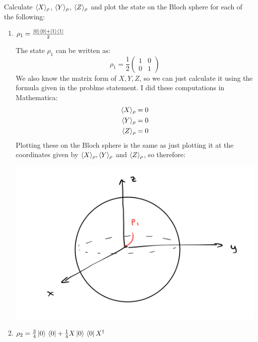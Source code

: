 \documentclass[10pt]{article}
\begin{document}
	 Calculate \( \langle X \rangle_{\rho} \), \( \langle Y \rangle_{\rho} \), \( \langle Z \rangle_{\rho} \) and plot 
	 the state on the Bloch sphere 
	 for each of the following:
	 \begin{enumerate}[label=\alph*)]
	 	\item \( \rho_1 = \frac{\ket*{0}\bra*{0} + \ket*{1}\bra*{1}}{2} \)

			\begin{solution}
				The state \( \rho_1 \) can be written as:
				\[
					\rho_1 = \frac{1}{2}\begin{pmatrix} 1 & 0\\0& 1 \end{pmatrix} 
				\] 
				We also know the matrix form of \( X, Y, Z \), so we can just calculate it using the formula given 
				in the problme statement. I did these computations
				in Mathematica: 
				\begin{align*}
					\langle X \rangle_\rho &= 0\\
					\langle Y \rangle_\rho &= 0 \\
					\langle Z \rangle_{\rho} &=  0 
				\end{align*}
				Plotting these on the Bloch sphere is the same as just plotting it at the coordinates
				given by \( \langle X \rangle_{\rho}, \langle Y \rangle_{\rho}  \) and \( \langle Z \rangle_{\rho} \), so therefore:
				\begin{center}
					\includegraphics[scale=0.2]{q3a.jpeg}
				\end{center}
			\end{solution}
		\item \( \rho_2 = \frac{3}{4}\ket*{0} \bra*{0} + \frac{1}{4}X\ket*{0} \bra*{0} X^{\dagger}\) 


\end{enumerate}
\end{document}
